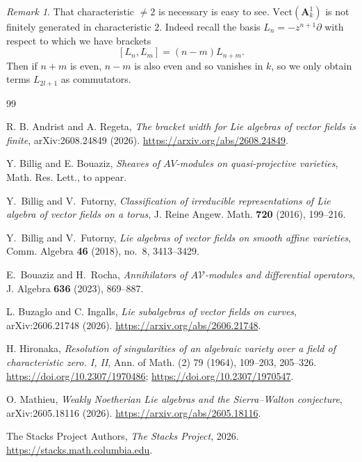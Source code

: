 \documentclass[12pt, oneside]{amsart}       %
\theoremstyle{remark}
\newtheorem*{remark}{Remark}
\newcommand{\aff}{\mathbf{A}}
\begin{document}
\begin{remark} That characteristic $\neq 2$ is necessary is easy to see. $\mathrm{Vect}(\aff^1_k)$ is not finitely generated in characteristic $2$. Indeed recall the basis $L_n=-z^{n+1}\partial$ with respect to which we have brackets $$[L_n,L_m]=(n-m)L_{n+m}.$$ Then if $n+m$ is even, $n-m$ is also even and so vanishes in $k$, so we only obtain terms $L_{2l+1}$ as commutators. \end{remark}


\begin{thebibliography}{99}
\small

 R. B. Andrist and A. Regeta, \emph{The bracket width for Lie algebras of vector fields is finite}, arXiv:2608.24849 (2026). \url{https://arxiv.org/abs/2608.24849}.



 Y. Billig and E. Bouaziz, \emph{Sheaves of $AV$-modules on quasi-projective varieties}, Math. Res. Lett., to appear.



Y.~Billig and V.~Futorny,
\emph{Classification of irreducible representations of Lie algebra
of vector fields on a torus},
J. Reine Angew. Math. \textbf{720} (2016), 199--216.

Y.~Billig and V.~Futorny,
\emph{Lie algebras of vector fields on smooth affine varieties},
Comm. Algebra \textbf{46} (2018), no.~8, 3413--3429.

E.~Bouaziz and H.~Rocha,
\emph{Annihilators of $A\mathcal{V}$-modules and differential operators},
J. Algebra \textbf{636} (2023), 869--887.

 L. Buzaglo and C. Ingalls, \emph{Lie subalgebras of vector fields on curves}, arXiv:2606.21748 (2026). \url{https://arxiv.org/abs/2606.21748}.




 H. Hironaka, \emph{Resolution of singularities of an algebraic variety over a field of characteristic zero. I, II}, Ann. of Math. (2) 79 (1964), 109--203, 205--326. \url{https://doi.org/10.2307/1970486}; \url{https://doi.org/10.2307/1970547}.

 O. Mathieu, \emph{Weakly Noetherian Lie algebras and the Sierra--Walton conjecture}, arXiv:2605.18116 (2026). \url{https://arxiv.org/abs/2605.18116}.

 The Stacks Project Authors, \emph{The Stacks Project}, 2026. \url{https://stacks.math.columbia.edu}.



\end{thebibliography}
\end{document}
